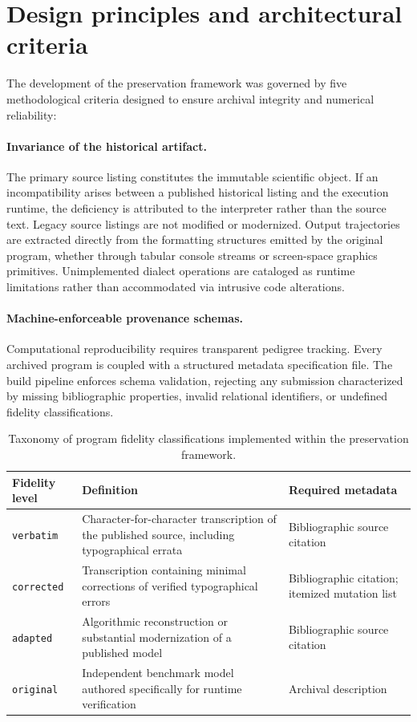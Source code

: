\documentclass[11pt,a4paper]{article}
\begin{document}
\section{Design principles and architectural criteria}
\label{sec:design}

The development of the preservation framework was governed by five methodological criteria designed to ensure archival integrity and numerical reliability:

\paragraph{Invariance of the historical artifact.} The primary source listing constitutes the immutable scientific object. If an incompatibility arises between a published historical listing and the execution runtime, the deficiency is attributed to the interpreter rather than the source text. Legacy source listings are not modified or modernized. Output trajectories are extracted directly from the formatting structures emitted by the original program, whether through tabular console streams or screen-space graphics primitives. Unimplemented dialect operations are cataloged as runtime limitations rather than accommodated via intrusive code alterations.

\paragraph{Machine-enforceable provenance schemas.} Computational reproducibility requires transparent pedigree tracking. Every archived program is coupled with a structured metadata specification file. The build pipeline enforces schema validation, rejecting any submission characterized by missing bibliographic properties, invalid relational identifiers, or undefined fidelity classifications. 

\begin{table}[h]
\centering\small
\begin{tabularx}{\linewidth}{@{}lXl@{}}
\toprule
Fidelity level & Definition & Required metadata \\
\midrule
\texttt{verbatim} & Character-for-character transcription of the published source, including typographical errata & Bibliographic source citation \\
\texttt{corrected} & Transcription containing minimal corrections of verified typographical errors & Bibliographic citation; itemized mutation list \\
\texttt{adapted} & Algorithmic reconstruction or substantial modernization of a published model & Bibliographic source citation \\
\texttt{original} & Independent benchmark model authored specifically for runtime verification & Archival description \\
\bottomrule
\end{tabularx}
\caption{Taxonomy of program fidelity classifications implemented within the preservation framework.}
\label{tab:fidelity}
\end{table}
\end{document}
